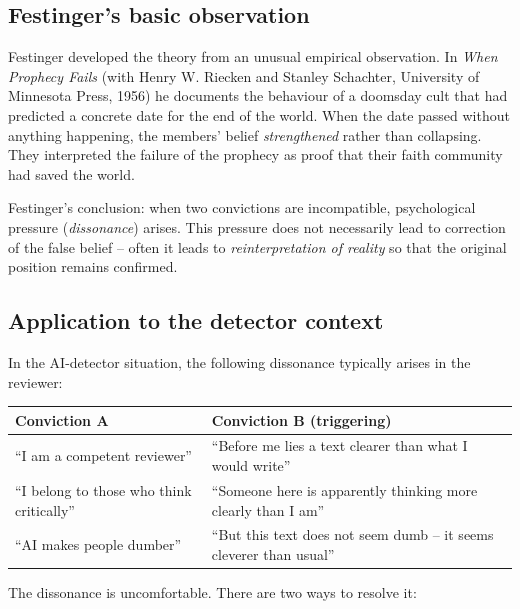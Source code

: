 \subsection{Festinger's basic observation}

Festinger developed the theory from an unusual empirical
observation. In \emph{When Prophecy Fails} (with Henry W. Riecken
and Stanley Schachter, University of Minnesota Press, 1956) he
documents the behaviour of a doomsday cult that had predicted a
concrete date for the end of the world. When the date passed
without anything happening, the members' belief \emph{strengthened}
rather than collapsing. They interpreted the failure of the
prophecy as proof that their faith community had saved the world.

Festinger's conclusion: when two convictions are incompatible,
psychological pressure (\emph{dissonance}) arises. This pressure
does not necessarily lead to correction of the false belief --
often it leads to \emph{reinterpretation of reality} so that the
original position remains confirmed.

\subsection{Application to the detector context}

In the AI-detector situation, the following dissonance typically
arises in the reviewer:

\begin{center}
\renewcommand{\arraystretch}{1.3}
{\small
\begin{tabular}{>{\raggedright\arraybackslash}p{5.0cm}>{\raggedright\arraybackslash}p{5.6cm}}
\toprule
\textbf{Conviction A} & \textbf{Conviction B (triggering)} \\
\midrule
\enquote{I am a competent reviewer} & \enquote{Before me lies a text clearer than what I would write} \\[2pt]
\enquote{I belong to those who think critically} & \enquote{Someone here is apparently thinking more clearly than I am} \\[2pt]
\enquote{AI makes people dumber} & \enquote{But this text does not seem dumb -- it seems cleverer than usual} \\
\bottomrule
\end{tabular}
}
\renewcommand{\arraystretch}{1.0}
\end{center}

The dissonance is uncomfortable. There are two ways to resolve it:

